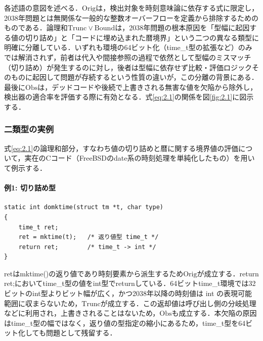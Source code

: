 \documentclass[submit,techrep,noauthor]{ipsj-lualatex}
\begin{document}
各述語の意図を述べる．$\mathrm{Orig}$は，検出対象を時刻意味論に依存する式に限定し，2038年問題とは無関係な一般的な整数オーバーフローを定義から排除するためのものである．論理和$\mathrm{Trunc} \lor \mathrm{Bound}$は，2038年問題の根本原因を「型幅に起因する値の切り詰め」と「コードに埋め込まれた暦境界」という二つの異なる類型に明確に分離している．いずれも環境の64ビット化（time\_t型の拡張など）のみでは解消されず，前者は代入や間接参照の過程で依然として型幅のミスマッチ（切り詰め）が発生するのに対し，後者は型幅に依存せず比較・評価ロジックそのものに起因して問題が存続するという性質の違いが，この分離の背景にある．最後に$\mathrm{Obs}$は，デッドコードや後続で上書きされる無害な値を欠陥から除外し，検出器の適合率を評価する際に有効となる．式\ref{eq:2.1}の関係を図\ref{fig:2.1}に図示する．

\subsubsection{二類型の実例}

式\ref{eq:2.1}の論理和部分，すなわち値の切り詰めと暦に関する境界値の評価について，実在のCコード（FreeBSD\cite{ref3}のdate系の時刻処理を単純化したもの）を用いて例示する．

\paragraph*{例1: 切り詰め型}

\begin{tcolorbox}[
	enhanced,
	breakable,
	colframe=black,
	colback=black!4,
	coltext=black,
	left=2mm,
	right=2mm,
	top=2mm,
	bottom=2mm,
	enlarge top by=4pt,
	enlarge bottom by=4pt,
	before skip=4pt,
	after skip=4pt,
]
\begin{verbatim}
static int domktime(struct tm *t, char type)
{
    time_t ret;
    ret = mktime(t);   /* 返り値型 time_t */
    return ret;        /* time_t -> int */
}
\end{verbatim}
\end{tcolorbox}

retはmktime()の返り値であり時刻要素から派生するため$\mathrm{Orig}$が成立する．return ret;においてtime\_t型の値をint型でreturnしている．64ビットtime\_t環境では32ビットのint型よりビット幅が広く，かつ2038年以降の時刻値は int の表現可能範囲に収まらないため，$\mathrm{Trunc}$が成立する．この返却値は呼び出し側の分岐処理などに利用され，上書きされることはないため，$\mathrm{Obs}$も成立する．本欠陥の原因はtime\_t型の幅ではなく，返り値の型指定の縮小にあるため，time\_t型を64ビット化しても問題として残留する．
\end{document}
